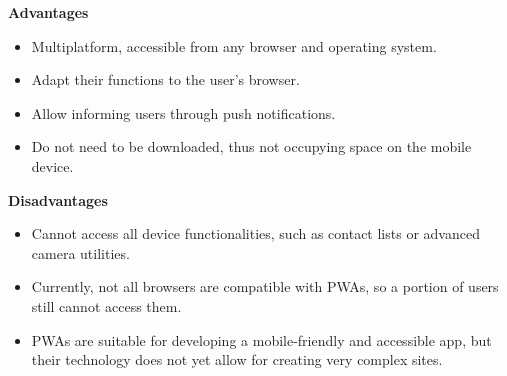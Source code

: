 \documentclass[10pt,a4paper]{article}
\begin{document}
	\textbf{Advantages}
	\begin{itemize}
		\item Multiplatform, accessible from any browser and operating system.
		\item Adapt their functions to the user's browser.
		\item Allow informing users through push notifications.
		\item Do not need to be downloaded, thus not occupying space on the mobile device.
	\end{itemize}
	
	\textbf{Disadvantages}
	\begin{itemize}
		\item Cannot access all device functionalities, such as contact lists or advanced camera utilities.
		\item Currently, not all browsers are compatible with PWAs, so a portion of users still cannot access them.
		\item PWAs are suitable for developing a mobile-friendly and accessible app, but their technology does not yet allow for creating very complex sites.
	\end{itemize}
\end{document}
